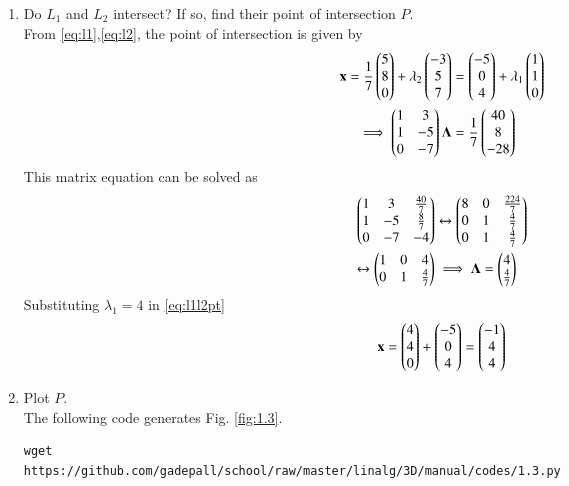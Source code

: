 \documentclass[journal,12pt,twocolumn]{IEEEtran}
\renewcommand\thesection{\arabic{section}}
\begin{document}
\begin{enumerate}[label=\thesection.\arabic*
,ref=\thesection.\theenumi]
\item Do $L_1$ and $L_2$ intersect? If so, find their point of intersection $P$.
\\
\solution From \eqref{eq:l1},\eqref{eq:l2}, the point of intersection is given by
\begin{align}
\label{eq:l1l2pt}
\mathbf{x} = \frac{1}{7}\begin{pmatrix} 5 \\ 8 \\ 0\end{pmatrix} + \lambda_2 \begin{pmatrix} -3 \\ 5 \\ 7\end{pmatrix} &= \begin{pmatrix} 
-5 \\ 0 \\ 4\end{pmatrix} + \lambda_1 \begin{pmatrix} 1 \\ 1 \\ 0\end{pmatrix}
\\
\implies 
\begin{pmatrix}1 &  3 \\ 1 & -5 \\ 0 & -7\end{pmatrix}\mathbf{\Lambda} &= \frac{1}{7}\begin{pmatrix}40 \\ 8 \\ -28\end{pmatrix}
\end{align}
This matrix equation can be solved as
\begin{align}
\begin{pmatrix}1 &  3 & \frac{40}{7}\\ 1 & -5 &\frac{8}{7}\\ 0 & -7 & -4\end{pmatrix} &\leftrightarrow \begin{pmatrix}8 &  0 & 
\frac{224}{7}\\ 0 & 1 &\frac{4}{7}\\ 0 & 1 & \frac{4}{7} \end{pmatrix}
\\
\leftrightarrow \begin{pmatrix}1 &  0 & 
4\\ 0 & 1 &\frac{4}{7} \end{pmatrix} &\implies \mathbf{\Lambda} = \begin{pmatrix}4\\\frac{4}{7}\end{pmatrix}
\end{align}
%
Substituting $\lambda_1 = 4$ in \eqref{eq:l1l2pt}
\begin{align}
\mathbf{x} = \begin{pmatrix}4 \\ 4 \\ 0\end{pmatrix} + \begin{pmatrix}-5 \\ 0 \\ 4\end{pmatrix} = \begin{pmatrix}-1\\ 4\\ 4\end{pmatrix}
\end{align}
\item Plot $P$.
\\
\solution The following code generates Fig. \ref{fig:1.3}.
\begin{lstlisting}
wget 
https://github.com/gadepall/school/raw/master/linalg/3D/manual/codes/1.3.py
\end{lstlisting}

\end{enumerate}
\end{document}
